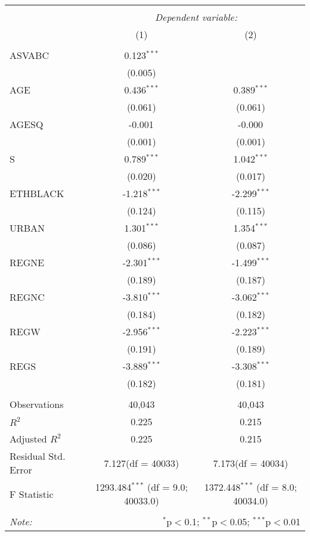 \begin{table}[!htbp] \centering
\begin{tabular}{@{\extracolsep{5pt}}lcc}
\\[-1.8ex]\hline
\hline \\[-1.8ex]
& \multicolumn{2}{c}{\textit{Dependent variable:}} \
\cr \cline{2-3}
\\[-1.8ex] & (1) & (2) \\
\hline \\[-1.8ex]
 ASVABC & 0.123$^{***}$ & \\
  & (0.005) & \\
 AGE & 0.436$^{***}$ & 0.389$^{***}$ \\
  & (0.061) & (0.061) \\
 AGESQ & -0.001$^{}$ & -0.000$^{}$ \\
  & (0.001) & (0.001) \\
 S & 0.789$^{***}$ & 1.042$^{***}$ \\
  & (0.020) & (0.017) \\
 ETHBLACK & -1.218$^{***}$ & -2.299$^{***}$ \\
  & (0.124) & (0.115) \\
 URBAN & 1.301$^{***}$ & 1.354$^{***}$ \\
  & (0.086) & (0.087) \\
 REGNE & -2.301$^{***}$ & -1.499$^{***}$ \\
  & (0.189) & (0.187) \\
 REGNC & -3.810$^{***}$ & -3.062$^{***}$ \\
  & (0.184) & (0.182) \\
 REGW & -2.956$^{***}$ & -2.223$^{***}$ \\
  & (0.191) & (0.189) \\
 REGS & -3.889$^{***}$ & -3.308$^{***}$ \\
  & (0.182) & (0.181) \\
\hline \\[-1.8ex]
 Observations & 40,043 & 40,043 \\
 $R^2$ & 0.225 & 0.215 \\
 Adjusted $R^2$ & 0.225 & 0.215 \\
 Residual Std. Error & 7.127(df = 40033) & 7.173(df = 40034)  \\
 F Statistic & 1293.484$^{***}$ (df = 9.0; 40033.0) & 1372.448$^{***}$ (df = 8.0; 40034.0) \\
\hline
\hline \\[-1.8ex]
\textit{Note:} & \multicolumn{2}{r}{$^{*}$p$<$0.1; $^{**}$p$<$0.05; $^{***}$p$<$0.01} \\
\end{tabular}
\end{table}